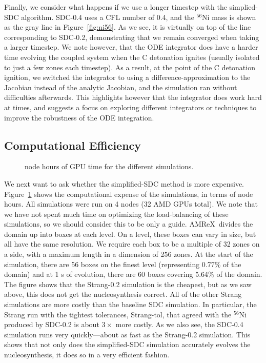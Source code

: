 \documentclass[preprint,linenumbers]{aastex631}
\newcommand{\isot}[2]{$^{#2}\mathrm{#1}$}
\newcommand{\amrex}{{\sf AMReX}}
\begin{document}


Finally, we consider what happens if we use a longer timestep with the simplied-SDC algorithm.  SDC-0.4 uses a CFL number of 0.4,
and the \isot{Ni}{56} mass is shown as the gray line in Figure~\ref{fig:ni56}.  As we see, it is virtually on top of the line corresponding to SDC-0.2, demonstrating that we remain converged when taking a larger timestep.  We note however, that the ODE integrator does have a harder time evolving the coupled system when the C detonation ignites (usually isolated to just a few zones each timestep).  As a result, at the point of the C detonation ignition, we switched the integrator to using a difference-approximation to the Jacobian \citep{lsode} instead of the analytic Jacobian,
and the simulation ran without difficulties afterwards.  This highlights however that the integrator does work hard at times, and suggests a focus on exploring different integrators or techniques to improve the robustness of the ODE integration.


\subsection{Computational Efficiency}

\begin{figure}[t]
\centering
{}
\caption{\label{fig:cpu} node hours of GPU time for the different simulations.}
\end{figure}



We next want to ask whether the simplified-SDC method is more
expensive.
Figure~\ref{fig:cpu} shows the computational expense of the
simulations, in terms of node hours.  All simulations were run on 4
nodes (32 AMD GPUs total).  We note that we have not spent much time on
optimizing the load-balancing of these simulations, so we should consider this to be
only a guide.  \amrex\ divides the domain up into
boxes at each level.  On a level, these boxes can vary in size, but all have the same resolution.  We require 
each box to be a multiple of 32 zones on a side, with a maximum length in a dimension of 256 zones.  At the start of the simulation, there are 56 boxes on
the finest level (representing 0.77\% of the domain) and at 1 s of
evolution, there are 60 boxes covering 5.64\% of the domain.  The
figure shows that the Strang-0.2 simulation is the
cheapest, but as we saw above, this does not get the nucleosynthesis
correct.  All of the other Strang simulations are more costly than the
baseline SDC simulation.  In particular, the Strang run with the tightest tolerances, Strang-tol, that agreed with the \isot{Ni}{56} produced by SDC-0.2 is about $3\times$ more costly.       As we also see, the SDC-0.4 simulation runs very quickly---about as fast as the Strang-0.2 simulation.
This shows that not only does the
simplified-SDC simulation accurately evolves the nucleosynthesis, it
does so in a very efficient fashion.  
\end{document}
